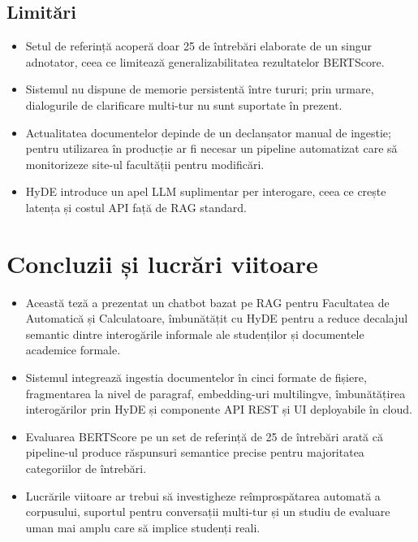 \documentclass[12pt,a4paper]{report}
\begin{document}
\section{Limitări}
\begin{itemize}
    \item Setul de referință acoperă doar 25 de întrebări elaborate de un singur adnotator, ceea ce limitează generalizabilitatea rezultatelor BERTScore.
    \item Sistemul nu dispune de memorie persistentă între tururi; prin urmare, dialogurile de clarificare multi-tur nu sunt suportate în prezent.
    \item Actualitatea documentelor depinde de un declanșator manual de ingestie; pentru utilizarea în producție ar fi necesar un pipeline automatizat care să monitorizeze site-ul facultății pentru modificări.
    \item HyDE introduce un apel LLM suplimentar per interogare, ceea ce crește latența și costul API față de RAG standard.
\end{itemize}


\chapter{Concluzii și lucrări viitoare}
\begin{itemize}
    \item Această teză a prezentat un chatbot bazat pe RAG pentru Facultatea de Automatică și Calculatoare, îmbunătățit cu HyDE pentru a reduce decalajul semantic dintre interogările informale ale studenților și documentele academice formale.
    \item Sistemul integrează ingestia documentelor în cinci formate de fișiere, fragmentarea la nivel de paragraf, embedding-uri multilingve, îmbunătățirea interogărilor prin HyDE și componente API REST și UI deployabile în cloud.
    \item Evaluarea BERTScore pe un set de referință de 25 de întrebări arată că pipeline-ul produce răspunsuri semantice precise pentru majoritatea categoriilor de întrebări.
    \item Lucrările viitoare ar trebui să investigheze reîmprospătarea automată a corpusului, suportul pentru conversații multi-tur și un studiu de evaluare uman mai amplu care să implice studenți reali.
\end{itemize}


\renewcommand\bibname{Referințe}
\clearpage{}\addcontentsline{toc}{chapter}{\bibname}


\end{document}
